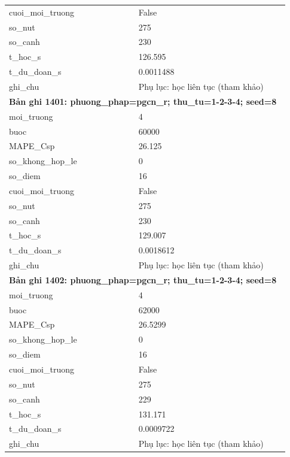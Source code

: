 \begin{longtable}{p{0.43\linewidth}p{0.50\linewidth}}
cuoi\_\allowbreak moi\_\allowbreak truong & False \\
so\_\allowbreak nut & 275 \\
so\_\allowbreak canh & 230 \\
t\_\allowbreak hoc\_\allowbreak s & 126.595 \\
t\_\allowbreak du\_\allowbreak doan\_\allowbreak s & 0.0011488 \\
ghi\_\allowbreak chu & Phụ lục: học liên tục (tham khảo) \\
\midrule
\multicolumn{2}{p{0.95\linewidth}}{\textbf{Bản ghi 1401: phuong\_phap=pgcn\_r; thu\_tu=1-2-3-4; seed=8}} \\
moi\_\allowbreak truong & 4 \\
buoc & 60000 \\
MAPE\_\allowbreak Csp & 26.125 \\
so\_\allowbreak khong\_\allowbreak hop\_\allowbreak le & 0 \\
so\_\allowbreak diem & 16 \\
cuoi\_\allowbreak moi\_\allowbreak truong & False \\
so\_\allowbreak nut & 275 \\
so\_\allowbreak canh & 230 \\
t\_\allowbreak hoc\_\allowbreak s & 129.007 \\
t\_\allowbreak du\_\allowbreak doan\_\allowbreak s & 0.0018612 \\
ghi\_\allowbreak chu & Phụ lục: học liên tục (tham khảo) \\
\midrule
\multicolumn{2}{p{0.95\linewidth}}{\textbf{Bản ghi 1402: phuong\_phap=pgcn\_r; thu\_tu=1-2-3-4; seed=8}} \\
moi\_\allowbreak truong & 4 \\
buoc & 62000 \\
MAPE\_\allowbreak Csp & 26.5299 \\
so\_\allowbreak khong\_\allowbreak hop\_\allowbreak le & 0 \\
so\_\allowbreak diem & 16 \\
cuoi\_\allowbreak moi\_\allowbreak truong & False \\
so\_\allowbreak nut & 275 \\
so\_\allowbreak canh & 229 \\
t\_\allowbreak hoc\_\allowbreak s & 131.171 \\
t\_\allowbreak du\_\allowbreak doan\_\allowbreak s & 0.0009722 \\
ghi\_\allowbreak chu & Phụ lục: học liên tục (tham khảo) \\

\end{longtable}
